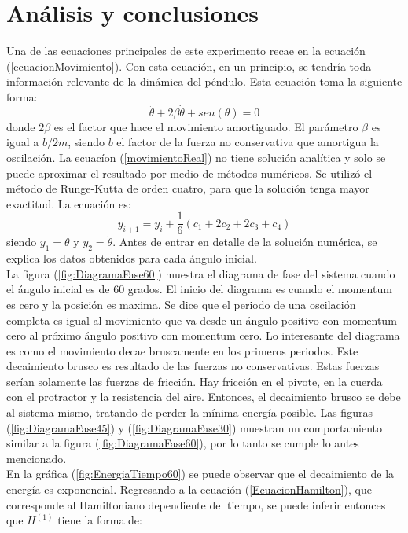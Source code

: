 \documentclass[aps,twocolumn,secnumarabic,nobalancelastpage,amsmath,amssymb,nofootinbib]{revtex4-1}
\begin{document}
	\section{An\'alisis y conclusiones}
		Una de las ecuaciones principales de este experimento recae en la ecuaci\'on (\ref{ecuacionMovimiento}). Con esta ecuaci\'on, en un principio, se tendr\'ia toda informaci\'on relevante de la din\'amica del p\'endulo. Esta ecuaci\'on toma la siguiente forma:
			\begin{equation}
				\ddot{\theta} + 2\beta\dot{\theta} + sen(\theta) = 0
				\label{movimientoReal}	
			\end{equation}  
		donde $2\beta$ es el factor que hace el movimiento amortiguado. El par\'ametro $\beta$ es igual a $b/2m$, siendo $b$ el factor de la fuerza no conservativa que amortigua la oscilaci\'on. La ecuac\'ion (\ref{movimientoReal}) no tiene soluci\'on anal\'itica y solo se puede aproximar el resultado por medio de m\'etodos num\'ericos. Se utiliz\'o el m\'etodo de Runge-Kutta de orden cuatro, para que la soluci\'on tenga mayor exactitud\cite{pang1999introduction}. La ecuaci\'on es: 
			\begin{equation}
				y_{i+1} = y_{i} + \frac{1}{6}(c_1 + 2c_2 + 2c_3 + c_4)
				\label{RKecuacion}	
			\end{equation} 
		siendo $y_1 = \theta$ y $y_2 = \dot{\theta}$. Antes de entrar en detalle de la soluci\'on num\'erica, se explica los datos obtenidos para cada \'angulo inicial.\\
		\indent La figura (\ref{fig:DiagramaFase60}) muestra el diagrama de fase del sistema cuando el \'angulo inicial es de 60 grados. El inicio del diagrama es cuando el momentum es cero y la posici\'on es maxima. Se dice que el periodo de una oscilaci\'on completa es igual al movimiento que va desde un \'angulo positivo con momentum cero al pr\'oximo \'angulo positivo con momentum cero. Lo interesante del diagrama es como el movimiento decae bruscamente en los primeros periodos. Este decaimiento brusco es resultado de las fuerzas no conservativas. Estas fuerzas ser\'ian solamente las fuerzas de fricci\'on. Hay fricci\'on en el pivote, en la cuerda con el protractor y la resistencia del aire. Entonces, el decaimiento brusco se debe al sistema mismo, tratando de perder la m\'inima energ\'ia posible. Las figuras (\ref{fig:DiagramaFase45}) y (\ref{fig:DiagramaFase30}) muestran un comportamiento similar a la figura (\ref{fig:DiagramaFase60}), por lo tanto se cumple lo antes mencionado.\\
		\indent En la gr\'afica (\ref{fig:EnergiaTiempo60}) se puede observar que el decaimiento de la energ\'ia es exponencial. Regresando a la ecuaci\'on (\ref{EcuacionHamilton}), que corresponde al Hamiltoniano dependiente del tiempo, se puede inferir entonces que $H^{(1)}$ tiene la forma de:
\end{document}
